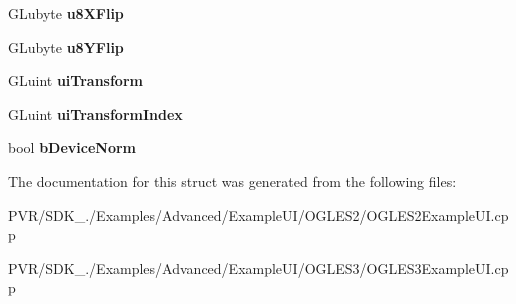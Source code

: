 \begin{DoxyCompactItemize}
\item 
\hypertarget{struct_layout_desc_af24b5d5a59c31f63551fec8ca47fa6df}{G\+Lubyte {\bfseries u8\+X\+Flip}}\label{struct_layout_desc_af24b5d5a59c31f63551fec8ca47fa6df}

\item 
\hypertarget{struct_layout_desc_abc3f8b97eb1313aa8b2d90578b104a19}{G\+Lubyte {\bfseries u8\+Y\+Flip}}\label{struct_layout_desc_abc3f8b97eb1313aa8b2d90578b104a19}

\item 
\hypertarget{struct_layout_desc_a3d613e7c5cccd180ba5a35a5ff2361a3}{G\+Luint {\bfseries ui\+Transform}}\label{struct_layout_desc_a3d613e7c5cccd180ba5a35a5ff2361a3}

\item 
\hypertarget{struct_layout_desc_ab9cf0df73d902538610644d60401a28c}{G\+Luint {\bfseries ui\+Transform\+Index}}\label{struct_layout_desc_ab9cf0df73d902538610644d60401a28c}

\item 
\hypertarget{struct_layout_desc_a54884a96db4de668c8da0592eab9dbce}{bool {\bfseries b\+Device\+Norm}}\label{struct_layout_desc_a54884a96db4de668c8da0592eab9dbce}

\end{DoxyCompactItemize}


The documentation for this struct was generated from the following files\+:\begin{DoxyCompactItemize}
\item 
P\+V\+R/\+S\+D\+K\+\_./\+Examples/\+Advanced/\+Example\+U\+I/\+O\+G\+L\+E\+S2/O\+G\+L\+E\+S2\+Example\+U\+I.\+cpp\item 
P\+V\+R/\+S\+D\+K\+\_./\+Examples/\+Advanced/\+Example\+U\+I/\+O\+G\+L\+E\+S3/O\+G\+L\+E\+S3\+Example\+U\+I.\+cpp\end{DoxyCompactItemize}
